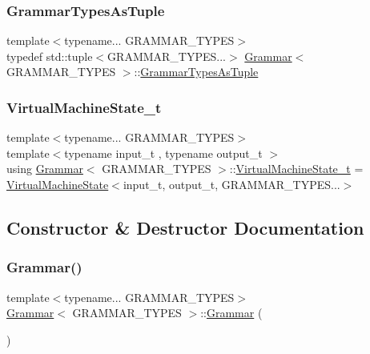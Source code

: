 \subsubsection{\texorpdfstring{Grammar\+Types\+As\+Tuple}{GrammarTypesAsTuple}}
{\footnotesize\ttfamily template$<$typename... G\+R\+A\+M\+M\+A\+R\+\_\+\+T\+Y\+P\+ES$>$ \\
typedef std\+::tuple$<$G\+R\+A\+M\+M\+A\+R\+\_\+\+T\+Y\+P\+E\+S...$>$ \hyperlink{class_grammar}{Grammar}$<$ G\+R\+A\+M\+M\+A\+R\+\_\+\+T\+Y\+P\+ES $>$\+::\hyperlink{class_grammar_a5ba44586d1c6f847cbbeeead91964e3c}{Grammar\+Types\+As\+Tuple}}

\mbox{\label{class_grammar_a30c2eaa4b378738686365fc6d8697f61}} 
\subsubsection{\texorpdfstring{Virtual\+Machine\+State\+\_\+t}{VirtualMachineState\_t}}
{\footnotesize\ttfamily template$<$typename... G\+R\+A\+M\+M\+A\+R\+\_\+\+T\+Y\+P\+ES$>$ \\
template$<$typename input\+\_\+t , typename output\+\_\+t $>$ \\
using \hyperlink{class_grammar}{Grammar}$<$ G\+R\+A\+M\+M\+A\+R\+\_\+\+T\+Y\+P\+ES $>$\+::\hyperlink{class_grammar_a30c2eaa4b378738686365fc6d8697f61}{Virtual\+Machine\+State\+\_\+t} =  \hyperlink{class_virtual_machine_state}{Virtual\+Machine\+State}$<$input\+\_\+t, output\+\_\+t, G\+R\+A\+M\+M\+A\+R\+\_\+\+T\+Y\+P\+E\+S...$>$}



\subsection{Constructor \& Destructor Documentation}
\mbox{\label{class_grammar_a2fa1d41e021616790a5ec8f4b3de9b08}} 
\subsubsection{\texorpdfstring{Grammar()}{Grammar()}\hspace{0.1cm}{\footnotesize\ttfamily [1/4]}}
{\footnotesize\ttfamily template$<$typename... G\+R\+A\+M\+M\+A\+R\+\_\+\+T\+Y\+P\+ES$>$ \\
\hyperlink{class_grammar}{Grammar}$<$ G\+R\+A\+M\+M\+A\+R\+\_\+\+T\+Y\+P\+ES $>$\+::\hyperlink{class_grammar}{Grammar} (\begin{DoxyParamCaption}{ }\end{DoxyParamCaption})\hspace{0.3cm}{\ttfamily [inline]}}

